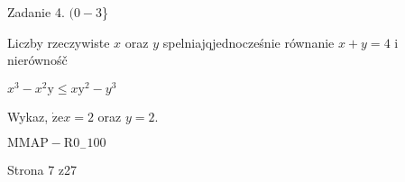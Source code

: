 \documentclass[a4paper,12pt]{article}
\begin{document}
Zadanie 4. $(0-3$\}

Liczby rzeczywiste $x$ oraz $y$ spelniajqjednocześnie równanie $x+y=4$ i nierównośč

$x^{3}-x^{2}\mathrm{y}\leq x\mathrm{y}^{2}-y^{3}$

Wykaz, $\dot{\mathrm{z}}\mathrm{e} x=2$ oraz $y=2.$

$\mathrm{M}\mathrm{M}\mathrm{A}\mathrm{P}-\mathrm{R}0_{-}100$

Strona 7 z27
\end{document}
